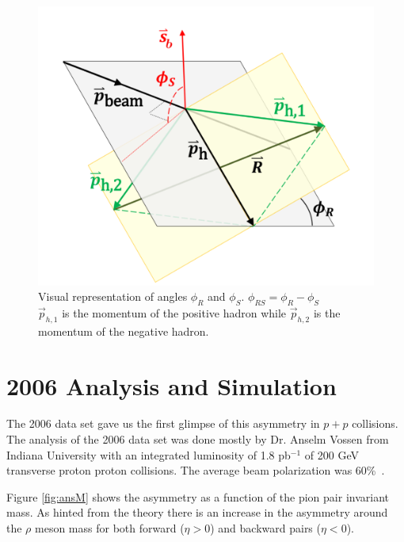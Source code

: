 \documentclass[letterpaper, abstract = on,listof=totoc, bibliography=totoc]{scrreprt}
\newcommand{\phir}{\phi_{R}}
\newcommand{\phis}{\phi_{S}}
\begin{document}
\begin{figure}
\begin{center}
\includegraphics[width = 1\textwidth]{IFF_frame_edit2}
\caption[Angles $\phis$ and $\phir$]{Visual representation of angles $\phi_R$ and $\phi_S$. $\phi_{RS} = \phi_R - \phi_S$ \\ $\vec{p}_{h,1}$ is the momentum of the positive hadron while  $\vec{p}_{h,2}$ is the momentum of the negative hadron.}
\label{fig:angleDeff}
\end{center}
\end{figure}




\chapter{2006 Analysis and Simulation}
\label{chap:2006}

The 2006 data set gave us the first glimpse of this asymmetry in $p+p$ collisions. The analysis of the 2006 data set was done mostly by Dr. Anselm Vossen from Indiana University with an integrated luminosity of 1.8 pb$^{-1}$ of 200 GeV transverse proton proton collisions. The average beam polarization was 60\%~\cite{2006Paper}. 



Figure \ref{fig:ansM} shows the asymmetry as a function of the pion pair invariant mass. As hinted from the theory there is an increase in the asymmetry around the $\rho$ meson mass for both forward ($\eta > 0$) and backward pairs ($\eta < 0$). 
\end{document}

